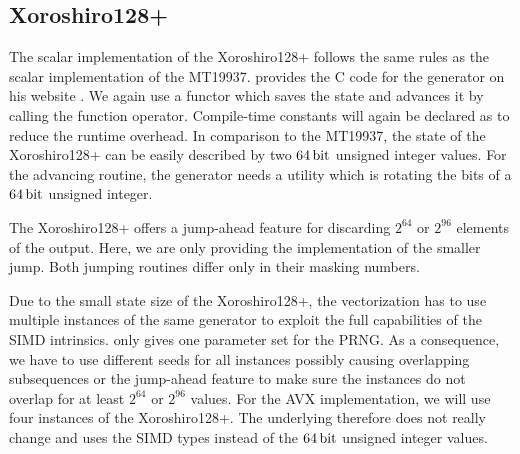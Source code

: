 \documentclass{stdlocal}
\begin{document}

  \subsection{Xoroshiro128+} %
  \label{sub:xoroshiro}
    The scalar implementation of the Xoroshiro128+ follows the same rules as the scalar implementation of the MT19937.
    \citeauthor{vigna-xoroshiro} provides the C code for the generator on his website \autocite{vigna-xoroshiro}.
    We again use a functor which saves the state and advances it by calling the function operator.
    Compile-time constants will again be declared as  to reduce the runtime overhead.
    In comparison to the MT19937, the state of the Xoroshiro128+ can be easily described by two $64\, \mathrm{bit}$ unsigned integer values.
    For the advancing routine, the generator needs a utility which is rotating the bits of a $64\, \mathrm{bit}$ unsigned integer.

    The Xoroshiro128+ offers a jump-ahead feature for discarding $2^{64}$ or $2^{96}$ elements of the output.
    Here, we are only providing the implementation of the smaller jump.
    Both jumping routines differ only in their masking numbers.


    Due to the small state size of the Xoroshiro128+, the vectorization has to use multiple instances of the same generator to exploit the full capabilities of the SIMD intrinsics.
    \citeauthor{vigna-xoroshiro} only gives one parameter set for the PRNG.
    As a consequence, we have to use different seeds for all instances possibly causing overlapping subsequences or the jump-ahead feature to make sure the instances do not overlap for at least $2^{64}$ or $2^{96}$ values.
    For the AVX implementation, we will use four instances of the Xoroshiro128+.
    The underlying therefore does not really change and uses the SIMD types instead of the $64\, \mathrm{bit}$ unsigned integer values.
\end{document}
